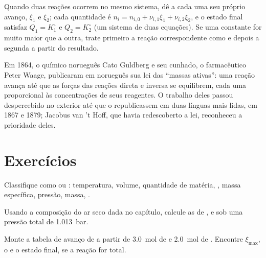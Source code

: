 \begin{method}\label{met:b1:extent-q-and-k:two-reactions}
Quando duas reações ocorrem no mesmo sistema, dê a cada uma seu próprio
avanço, $\xi_1$ e $\xi_2$; cada quantidade é $n_i = n_{i,0} + \nu_{i,1}\xi_1
+ \nu_{i,2}\xi_2$, e o estado final satisfaz $Q_1 = K_1^\circ$ e
$Q_2 = K_2^\circ$ (um sistema de duas equações). Se uma constante for
muito maior que a outra, trate primeiro a reação correspondente como
 e depois a segunda a partir do resultado.
\end{method}

\begin{history}
Em 1864, o químico norueguês Cato Guldberg e seu cunhado, o farmacêutico
Peter Waage, publicaram em norueguês sua lei das ``massas ativas'': uma
reação avança até que as forças das reações direta e inversa se
equilibrem, cada uma proporcional às concentrações de seus reagentes. O
trabalho deles passou despercebido no exterior até que o republicassem
em duas línguas mais lidas, em 1867 e 1879; Jacobus van 't Hoff, que
havia redescoberto a lei, reconheceu a prioridade deles.
\end{history}

\section{Exercícios}

\begin{exercise}[$\star$]\label{exo:b1:extent-q-and-k:1}
Classifique como  ou : temperatura, volume, quantidade
de matéria, , massa específica, pressão, massa, .
\end{exercise}

\begin{exercise}[$\star$]\label{exo:b1:extent-q-and-k:2}
Usando a composição do ar seco dada no capítulo, calcule as  de ,  e  sob uma pressão total de
\qty{1.013}{bar}.
\end{exercise}

\begin{exercise}[$\star$]\label{exo:b1:extent-q-and-k:3}
Monte a tabela de avanço de  a partir de
\qty{3.0}{mol} de  e \qty{2.0}{mol} de . Encontre
$\xi_{\max}$, o  e o estado final, se a reação for total.
\end{exercise}

